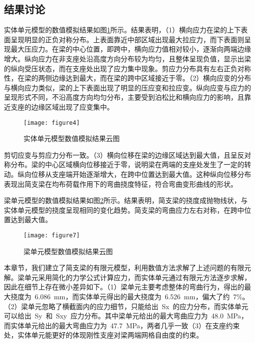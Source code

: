 \subsection{结果讨论}
实体单元模型的数值模拟结果如图\ref{fig:fea}所示。结果表明，（1）横向应力在梁的上下表面呈现明显的正负对称分布。上表面靠近中部区域出现最大拉应力，而下表面则呈现最大压应力。在梁的中心位置，即跨中，横向应力值相对较小，逐渐向两端边缘增大。纵向应力在非支座处沿高度方向分布较为均匀，且整体呈现负值，显示出梁的纵向受压状态，而在支座处出现了应力集中现象。剪应力分布具有左右正负对称性，在梁的两侧边缘达到最大，而在梁的跨中区域接近于零。（2）横向应变的分布与横向应力类似，梁的上下表面出现了明显的压应变和拉应变。纵向应变与应力的呈现形式不同，不沿高度方向均匀分布，主要受到泊松比和横向应力的影响，且靠近支座的边缘区域出现了应变集中。
\begin{figure}[htbp]
    \centering
	\texttt{[image: figure4]}
    \caption{实体单元模型数值模拟结果云图}
    \label{fig:fea}
\end{figure}
剪切应变与剪应力分布一致。（3）横向位移在梁的边缘区域达到最大值，且呈反对称分布。梁的中心区域横向位移接近于零，说明梁在两端的支座处发生了一定的转动。纵向位移从支座端开始逐渐增大，在跨中位置达到最大值。这种纵向位移分布表现出简支梁在均布荷载作用下的弯曲挠度特征，符合弯曲变形曲线的形状。

梁单元模型的数值模拟结果如图\ref{fig:BEAMfea}所示。结果表明，简支梁的挠度成抛物线状，与实体单元模型的挠度呈现相同的变化趋势。简支梁的弯曲应力左右对称，在跨中位置达到最大值。
\begin{figure}[htbp]
    \centering
	\texttt{[image: figure7]}
    \caption{梁单元模型数值模拟结果云图}
    \label{fig:BEAMfea}
\end{figure}

本章节，我们建立了简支梁的有限元模型，利用数值方法求解了上述问题的有限元解。梁单元采用简化的力学公式计算应力，而实体单元通过有限元方法逐步求解，因此在细节上存在微小差异如下。（1）梁单元主要考虑整体的弯曲行为，得出的最大挠度为~6.086~mm，而实体单元得出的最大挠度为~6.526~mm，偏大了约~7\%。（2）梁单元忽略了横截面内的应力细节，只能给出~Sx~的应力分布，而实体单元可以给出~Sy~和~Sxy~应力分布。其中梁单元给出的最大弯曲应力为~48.0~MPa，而实体单元给出的最大弯曲应力为~47.7~MPa，两者几乎一致（3）在支座约束处，实体单元能更好的体现刚性支座对梁两端网格自由度的约束。
